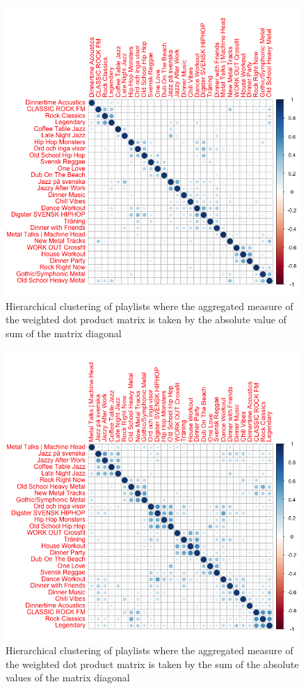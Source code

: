 \documentclass[a4paper,11pt]{kth-mag}
\begin{document}
\begin{figure}
\includegraphics[scale=0.5]{images/absSum.png}
\caption{Hierarchical clustering of playlists where the aggregated measure of the weighted dot product matrix is taken by the absolute value of sum of the matrix diagonal}
\end{figure}

\begin{figure}
\includegraphics[scale=0.5]{images/sumAbs.png}
\caption{Hierarchical clustering of playlists where the aggregated measure of the weighted dot product matrix is taken by the sum of the absolute values of the matrix diagonal}
\end{figure}
\end{document}
